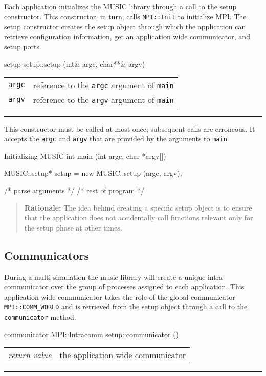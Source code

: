 \documentclass[a4paper]{report}
\makeatletter
\newenvironment{rationale}%
{\par\begin{quote}\textbf{Rationale:}}%
{\par\end{quote}}
\newenvironment{parameters}%
{\begin{tabular}{@{\hspace{2em}}lp{0.6\textwidth}}}%
{\end{tabular}\par\vspace{1mm}\par\hrule\par\vspace{5mm}}
\makeatother
\begin{document}
Each application initializes the MUSIC library through a call to the
setup constructor.  This constructor, in turn, calls
\lstinline|MPI::Init| to initialize
MPI.  The setup constructor creates the setup
object through which the application can retrieve configuration
information, get an application wide communicator, and setup ports.

\begin{head}{setup}
  setup::setup (int& argc, char**& argv)
\end{head}
\begin{parameters}
  \lstinline|argc| &%
  reference to the \lstinline|argc| argument of \lstinline|main| \\
  \lstinline|argv| &%
  reference to the \lstinline|argv| argument of \lstinline|main| \\
\end{parameters}

This constructor must be called at most once; subsequent calls are
erroneous.  It accepts the \lstinline|argc| and \lstinline|argv| that are
provided by the arguments to \lstinline|main|.

\begin{code}{Initializing MUSIC}
int main (int argc, char *argv[])
{
  MUSIC::setup* setup = new MUSIC::setup (argc, argv);

  /* parse arguments */
  /* rest of program */
}
\end{code}

\begin{rationale}
  The idea behind creating a specific setup object is to ensure that
  the application does not accidentally call functions relevant only
  for the setup phase at other times.
\end{rationale}


\subsection{Communicators}

During a multi-simulation the music library will create a unique
intra-communicator over the group of processes assigned to each
application.  This application wide communicator takes the role of the
global communicator \lstinline|MPI::COMM_WORLD| and is retrieved from
the setup object through a call to the \lstinline|communicator|
method.

\begin{head}{communicator}
  MPI::Intracomm setup::communicator ()
\end{head}
\begin{parameters}
  \emph{return value} & the application wide communicator \\
\end{parameters}
\end{document}
